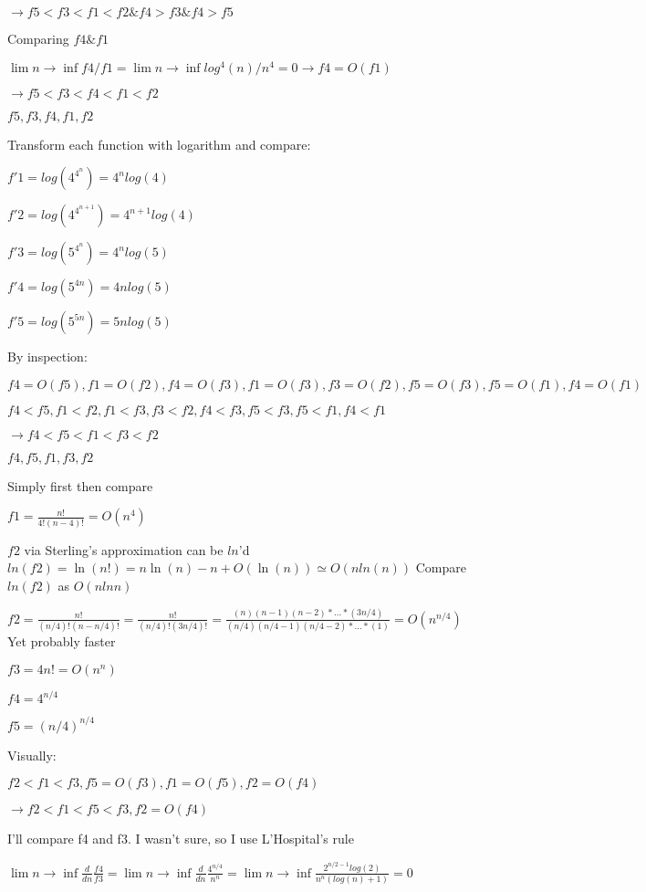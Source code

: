 \documentclass[12pt,twoside]{article}
\begin{document}
\begin{problems}
\begin{problemparts}
$ \rightarrow f5 < f3 < f1 < f2 \& f4 > f3 \& f4 > f5 $

Comparing $f4 \& f1$

$ \lim n \rightarrow \inf f4/f1 = \lim n \rightarrow \inf log^{4}(n) / n^{4} = 0 \rightarrow f4 = O(f1) $

$ \rightarrow f5 < f3 < f4 < f1 < f2$

$f5, f3, f4, f1, f2$

\problempart  %
Transform each function with logarithm and compare:

$f'1 = log(4^{4^{n}}) = 4^{n}log(4)$

$f'2 = log(4^{4^{n + 1}}) = 4^{n+1}log(4)$

$f'3 = log(5^{4^{n}}) = 4^{n}log(5)$

$f'4 = log(5^{4n}) = 4nlog(5)$

$f'5 = log(5^{5n})= 5nlog(5)$

By inspection:

$ f4 = O(f5), f1 = O(f2), f4 = O(f3), f1 = O(f3), f3 = O(f2), f5 = O(f3), f5 = O(f1), f4 = O(f1) $

$ f4 < f5, f1 < f2, f1 < f3, f3 < f2, f4 < f3, f5 < f3, f5 < f1, f4 < f1$

$ \rightarrow f4 < f5 < f1 < f3 < f2$

$ f4, f5, f1, f3, f2$

\problempart  Simply first then compare %

$ f1 = \frac{n!}{4!(n-4)!} = O(n^{4}) $

$f2$ via Sterling's approximation can be $ln$'d $ln(f2) = \ln(n!) = n\ln(n) - n +O(\ln(n)) \simeq O(nln(n))$ Compare $ln(f2)$ as $O(nlnn)$ %

$ f2 = \frac{n!}{(n/4)!(n-n/4)!} = \frac{n!}{(n/4)!(3n/4)!}  = \frac{(n)(n-1)(n-2)*...*(3n/4)}{(n/4)(n/4 -1)(n/4 - 2)*...*(1)} = O(n^{n/4})$ Yet probably faster

$ f3 = 4n! = O(n^n)$

$ f4 = 4^{n/4} $

$ f5 = (n/4)^{n/4} $

Visually:

$ f2 < f1 < f3, f5 = O(f3), f1 = O(f5), f2 = O(f4) $

$ \rightarrow f2 < f1 < f5 < f3, f2 = O(f4) $

I'll compare f4 and f3. I wasn't sure, so I use L'Hospital's rule

$ \lim n \rightarrow \inf \frac{d}{dn} \frac{f4}{f3} = \lim n \rightarrow \inf \frac{d}{dn} \frac{4^{n/4}}{n^n} = \lim n \rightarrow \inf \frac{2^{n/2 -1}log(2)}{n^n(log(n) + 1)} = 0 $


\end{problemparts}
\end{problems}
\end{document}
